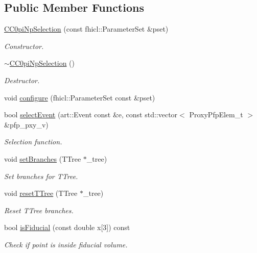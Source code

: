 \subsection*{Public Member Functions}
\begin{DoxyCompactItemize}
\item 
\hyperlink{classselection_1_1CC0piNpSelection_a5770519e6639db45cb9f3a4b1bf3efc2}{C\-C0pi\-Np\-Selection} (const fhicl\-::\-Parameter\-Set \&pset)
\begin{DoxyCompactList}\small\item\em Constructor. \end{DoxyCompactList}\item 
\hypertarget{classselection_1_1CC0piNpSelection_a7f809f358e84885ae2f08f54b4b8183b}{\hyperlink{classselection_1_1CC0piNpSelection_a7f809f358e84885ae2f08f54b4b8183b}{$\sim$\-C\-C0pi\-Np\-Selection} ()}\label{classselection_1_1CC0piNpSelection_a7f809f358e84885ae2f08f54b4b8183b}

\begin{DoxyCompactList}\small\item\em Destructor. \end{DoxyCompactList}\item 
void \hyperlink{classselection_1_1CC0piNpSelection_ace78372ffb6d92911f79ded647aacf4c}{configure} (fhicl\-::\-Parameter\-Set const \&pset)
\item 
bool \hyperlink{classselection_1_1CC0piNpSelection_aee88d296a2ebad59acadfd919139d96f}{select\-Event} (art\-::\-Event const \&e, const std\-::vector$<$ Proxy\-Pfp\-Elem\-\_\-t $>$ \&pfp\-\_\-pxy\-\_\-v)
\begin{DoxyCompactList}\small\item\em Selection function. \end{DoxyCompactList}\item 
void \hyperlink{classselection_1_1CC0piNpSelection_a6a14e4d0ff713ed2c75055019d278422}{set\-Branches} (T\-Tree $\ast$\-\_\-tree)
\begin{DoxyCompactList}\small\item\em Set branches for T\-Tree. \end{DoxyCompactList}\item 
void \hyperlink{classselection_1_1CC0piNpSelection_a3d7a6aa0fbd41f4a77390a160ee64e35}{reset\-T\-Tree} (T\-Tree $\ast$\-\_\-tree)
\begin{DoxyCompactList}\small\item\em Reset T\-Tree branches. \end{DoxyCompactList}\item 
bool \hyperlink{classselection_1_1CC0piNpSelection_ac3f55283ce26e2af8d5ba86a9faf0d23}{is\-Fiducial} (const double x\mbox{[}3\mbox{]}) const 
\begin{DoxyCompactList}\small\item\em Check if point is inside fiducial volume. \end{DoxyCompactList}\end{DoxyCompactItemize}
